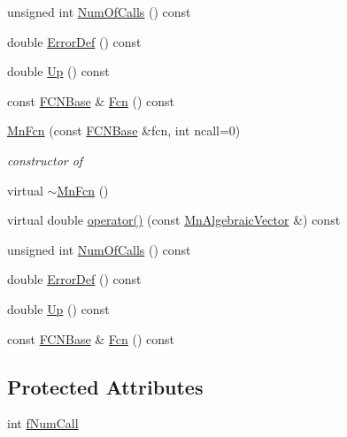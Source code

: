 \begin{DoxyCompactItemize}
\item 
unsigned int \mbox{\hyperlink{classROOT_1_1Minuit2_1_1MnFcn_af8dc896f10dc8a53429260198cd0e1c5}{Num\+Of\+Calls}} () const
\item 
double \mbox{\hyperlink{classROOT_1_1Minuit2_1_1MnFcn_abca32e4dd5ef187be7e099df14b4b54a}{Error\+Def}} () const
\item 
double \mbox{\hyperlink{classROOT_1_1Minuit2_1_1MnFcn_a2c91d0dd77e9c913116fb84b6fe31633}{Up}} () const
\item 
const \mbox{\hyperlink{classROOT_1_1Minuit2_1_1FCNBase}{F\+C\+N\+Base}} \& \mbox{\hyperlink{classROOT_1_1Minuit2_1_1MnFcn_a667fd993a6bb4832e6e70b7eaaca9fa4}{Fcn}} () const
\item 
\mbox{\hyperlink{classROOT_1_1Minuit2_1_1MnFcn_a882c5c26556515b2bbe0d07f50b32f4f}{Mn\+Fcn}} (const \mbox{\hyperlink{classROOT_1_1Minuit2_1_1FCNBase}{F\+C\+N\+Base}} \&fcn, int ncall=0)
\begin{DoxyCompactList}\small\item\em constructor of \end{DoxyCompactList}\item 
virtual \mbox{\hyperlink{classROOT_1_1Minuit2_1_1MnFcn_af4e4b9979af77ae593ceea7e7db82e2d}{$\sim$\+Mn\+Fcn}} ()
\item 
virtual double \mbox{\hyperlink{classROOT_1_1Minuit2_1_1MnFcn_ad981818a8e3bba0ec2cb0300238a5610}{operator()}} (const \mbox{\hyperlink{namespaceROOT_1_1Minuit2_a62ed97730a1ca8d3fbaec64a19aa11c9}{Mn\+Algebraic\+Vector}} \&) const
\item 
unsigned int \mbox{\hyperlink{classROOT_1_1Minuit2_1_1MnFcn_af8dc896f10dc8a53429260198cd0e1c5}{Num\+Of\+Calls}} () const
\item 
double \mbox{\hyperlink{classROOT_1_1Minuit2_1_1MnFcn_abca32e4dd5ef187be7e099df14b4b54a}{Error\+Def}} () const
\item 
double \mbox{\hyperlink{classROOT_1_1Minuit2_1_1MnFcn_a2c91d0dd77e9c913116fb84b6fe31633}{Up}} () const
\item 
const \mbox{\hyperlink{classROOT_1_1Minuit2_1_1FCNBase}{F\+C\+N\+Base}} \& \mbox{\hyperlink{classROOT_1_1Minuit2_1_1MnFcn_a667fd993a6bb4832e6e70b7eaaca9fa4}{Fcn}} () const
\end{DoxyCompactItemize}
\subsection*{Protected Attributes}
\begin{DoxyCompactItemize}
\item 
int \mbox{\hyperlink{classROOT_1_1Minuit2_1_1MnFcn_a5a9224bf6024caf935f26488ed112e10}{f\+Num\+Call}}
\end{DoxyCompactItemize}



